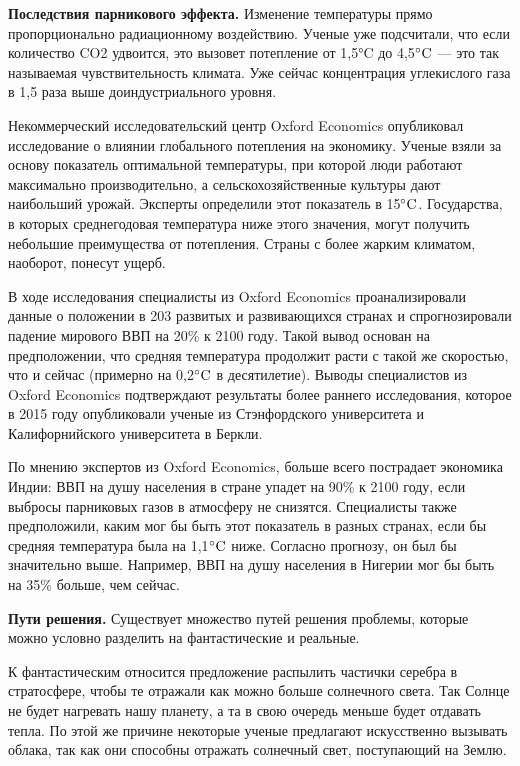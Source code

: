 \textbf{Последствия парникового эффекта.}
Изменение температуры прямо пропорционально радиационному воздействию. Ученые уже подсчитали, что если количество CO2 удвоится, это вызовет потепление от 1,5°C до 4,5$^{\circ}\rm{C}$ — это так называемая чувствительность климата. Уже сейчас концентрация углекислого газа в 1,5 раза выше доиндустриального уровня.

Некоммерческий исследовательский центр Oxford Economics опубликовал исследование о влиянии глобального потепления на экономику. Ученые взяли за основу показатель оптимальной температуры, при которой люди работают максимально производительно, а сельскохозяйственные культуры дают наибольший урожай. Эксперты определили этот показатель в 15$^{\circ}\rm{C}$. Государства, в которых среднегодовая температура ниже этого значения, могут получить небольшие преимущества от потепления. Страны с более жарким климатом, наоборот, понесут ущерб.

В ходе исследования специалисты из Oxford Economics проанализировали данные о положении в 203 развитых и развивающихся странах и спрогнозировали падение мирового ВВП на 20\% к 2100 году. Такой вывод основан на предположении, что средняя температура продолжит расти с такой же скоростью, что и сейчас (примерно на 0,2$^{\circ}\rm{C}$ в десятилетие). Выводы специалистов из Oxford Economics подтверждают результаты более раннего исследования, которое в 2015 году опубликовали ученые из Стэнфордского университета и Калифорнийского университета в Беркли.

По мнению экспертов из Oxford Economics, больше всего пострадает экономика Индии: ВВП на душу населения в стране упадет на 90\% к 2100 году, если выбросы парниковых газов в атмосферу не снизятся. Специалисты также предположили, каким мог бы быть этот показатель в разных странах, если бы средняя температура была на 1,1$^{\circ}\rm{C}$ ниже. Согласно прогнозу, он был бы значительно выше. Например, ВВП на душу населения в Нигерии мог бы быть на 35\% больше, чем сейчас.


\textbf{Пути решения.}
Существует множество путей решения проблемы, которые можно условно разделить на фантастические и реальные.

К фантастическим относится предложение распылить частички серебра в стратосфере, чтобы те отражали как можно больше солнечного света. Так Солнце не будет нагревать нашу планету, а та в свою очередь меньше будет отдавать тепла. По этой же причине некоторые ученые предлагают искусственно вызывать облака, так как они способны отражать солнечный свет, поступающий на Землю.

